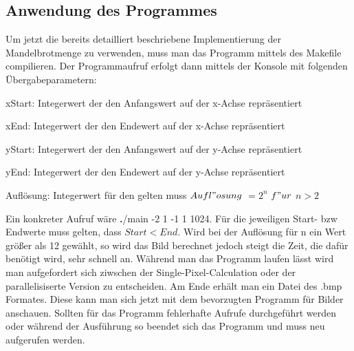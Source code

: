 \documentclass[11pt]{scrartcl}
\begin{document}
\subsection{Anwendung des Programmes}

Um jetzt die bereits detailliert beschriebene Implementierung der Mandelbrotmenge zu verwenden, muss man das Programm mittels des Makefile compilieren. Der Programmaufruf erfolgt dann mittels der Konsole mit folgenden Übergabeparametern:
\begin{center}
  xStart: Integerwert der den Anfangswert auf der x-Achse repräsentiert

  xEnd: Integerwert der den Endewert auf der x-Achse repräsentiert

  yStart: Integerwert der den Anfangswert auf der y-Achse repräsentiert

  yEnd: Integerwert der den Endewert auf der y-Achse repräsentiert

  Auflösung: Integerwert für den gelten muss $Aufl"osung$ $= 2^n$ $f"ur$ $n>2$
\end{center}

Ein konkreter Aufruf wäre {\textbf./main -2 1 -1 1 1024}.
Für die jeweiligen Start- bzw Endwerte muss gelten, dass $Start < End$.
Wird bei der Auflösung für n ein Wert größer als 12 gewählt, so wird das Bild berechnet jedoch steigt die Zeit, die dafür benötigt wird, sehr schnell an.
Während man das Programm laufen lässt wird man aufgefordert sich ziwschen der Single-Pixel-Calculation oder der parallelisiserte Version zu entscheiden.
Am Ende erhält man ein Datei des .bmp Formates. Diese kann man sich jetzt mit dem bevorzugten Programm für Bilder anschauen.
Sollten für das Programm fehlerhafte Aufrufe durchgeführt werden oder während der Ausführung so beendet sich das Programm und muss neu aufgerufen werden.
\end{document}
